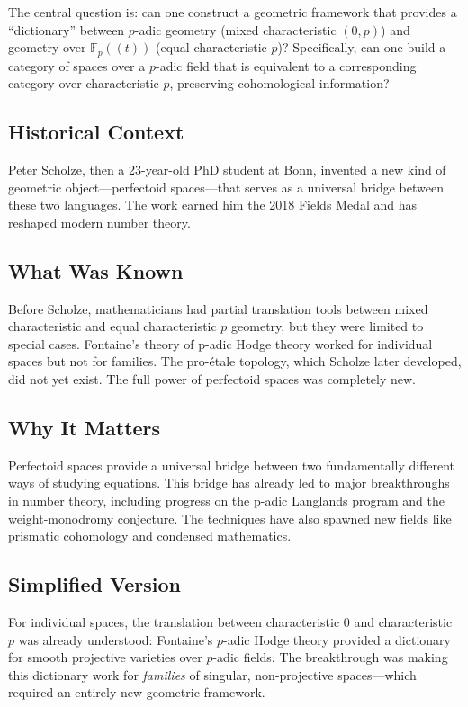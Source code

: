 The central question is: can one construct a geometric framework that provides a ``dictionary'' between $p$-adic geometry (mixed characteristic $(0,p)$) and geometry over $\mathbb{F}_p((t))$ (equal characteristic $p$)? Specifically, can one build a category of spaces over a $p$-adic field that is equivalent to a corresponding category over characteristic $p$, preserving cohomological information?

\subsection{Historical Context}
Peter Scholze, then a 23-year-old PhD student at Bonn, invented a new kind of geometric object---perfectoid spaces---that serves as a universal bridge between these two languages. The work earned him the 2018 Fields Medal and has reshaped modern number theory.

\subsection{What Was Known}
Before Scholze, mathematicians had partial translation tools between mixed characteristic and equal characteristic $p$ geometry, but they were limited to special cases. Fontaine's theory of p-adic Hodge theory worked for individual spaces but not for families. The pro-\'etale topology, which Scholze later developed, did not yet exist. The full power of perfectoid spaces was completely new.

\subsection{Why It Matters}
Perfectoid spaces provide a universal bridge between two fundamentally different ways of studying equations. This bridge has already led to major breakthroughs in number theory, including progress on the p-adic Langlands program and the weight-monodromy conjecture. The techniques have also spawned new fields like prismatic cohomology and condensed mathematics.

\subsection{Simplified Version}
For individual spaces, the translation between characteristic 0 and characteristic $p$ was already understood: Fontaine's $p$-adic Hodge theory provided a dictionary for smooth projective varieties over $p$-adic fields. The breakthrough was making this dictionary work for \emph{families} of singular, non-projective spaces---which required an entirely new geometric framework.

